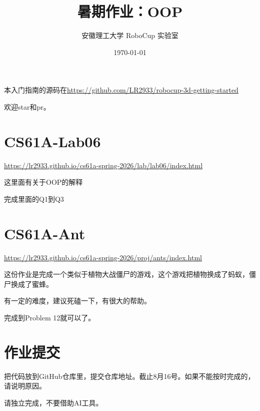 \documentclass[11pt, UTF8, a4paper]{ctexart} %
\title{\textbf{暑期作业：OOP}}
\author{安徽理工大学 RoboCup 实验室}
\date{\today}
\begin{document}
\maketitle

本入门指南的源码在\url{https://github.com/LR2933/robocup-3d-getting-started}

欢迎star和pr。
\tableofcontents %
\newpage
\section{CS61A-Lab06}
\url{https://lr2933.github.io/cs61a-spring-2026/lab/lab06/index.html}

这里面有关于OOP的解释

完成里面的Q1到Q3

\section{CS61A-Ant}
\url{https://lr2933.github.io/cs61a-spring-2026/proj/ants/index.html}

这份作业是完成一个类似于植物大战僵尸的游戏，这个游戏把植物换成了蚂蚁，僵尸换成了蜜蜂。

有一定的难度，建议死磕一下，有很大的帮助。

完成到Problem 12就可以了。

\section{作业提交}
把代码放到GitHub仓库里，提交仓库地址。截止8月16号。如果不能按时完成的，请说明原因。

请独立完成，不要借助AI工具。
\end{document}
